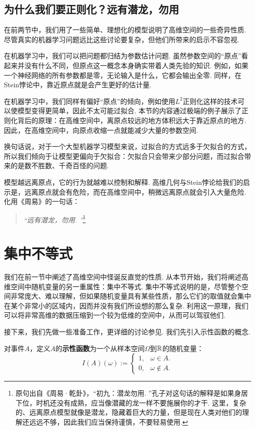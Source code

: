\subsection{为什么我们要正则化？远有潜龙，勿用}

在前两节中，我们用了一些简单、理想化的模型说明了高维空间的一些奇异性质. 尽管真实的机器学习问题远比这些讨论要复杂，但他们所带来的启示不容忽视. 

在机器学习中，我们可以把问题都归结为参数估计问题. 虽然参数空间的“原点”看起来并没有什么不同，但原点这一概念本身确实带着人类先验的知识. 例如，如果一个神经网络的所有参数都是零，无论输入是什么，它都会输出全零. 同样，在Stein悖论中，靠近原点就是会产生更好的估计量. 

在机器学习中，我们同样有偏好“原点”的倾向，例如使用$L^2$正则化这样的技术可以使模型变得更简单，因此不太可能过拟合. 本节的内容通过极端的例子展示了正则化背后的原理：在高维空间中，离原点较远的地方体积远大于靠近原点的地方. 因此，在高维空间中，向原点收缩一点就能减少大量的参数空间. 

换句话说，对于一个大型机器学习模型来说，过拟合的方式远多于欠拟合的方式，所以我们倾向于让模型更偏向于欠拟合：欠拟合只会带来少部分问题，而过拟合带来的是数不胜数、千奇百怪的问题. 

模型越远离原点，它的行为就越难以控制和解释. 高维几何与Stein悖论给我们的启示是，远离原点就会有危险，而在高维空间中，稍微远离原点就会引入大量危险. 化用《周易》的一句话：
\begin{quotation}
    \textit{“远有潜龙，勿用. ”}\footnote{原句出自《周易·乾卦》，“初九：潜龙勿用. ”孔子对这句话的解释是如果身居下位，时机还没有成熟，应当像潜藏的龙一样不要施展你的才干. 这里，复杂的、远离原点模型就像是潜龙，隐藏着巨大的力量，但是现在人类对他们的理解还远远不够，因此我们应当保持谨慎，不要轻易使用. }
\end{quotation}

\section{集中不等式}

我们在前一节中阐述了高维空间中怪诞反直觉的性质. 从本节开始，我们将阐述高维空间中随机变量的另一重属性：集中不等式. 集中不等式说明的是，尽管整个空间非常庞大、难以理解，但如果随机变量具有某些性质，那么它们的取值就会集中在某个非常小的区域内，因而并没有我们所设想的那么复杂. 利用这一原理，我们可以将非常高维的数据压缩到一个较为低维的空间中，从而可以驾驭他们. 

接下来，我们先做一些准备工作，更详细的讨论参见. 我们先引入示性函数的概念.
\begin{definition}[示性函数]\label{def:indicator-function}
    对事件$A$，定义$A$的\textbf{示性函数}为一个从样本空间$\Omega$到$\mathbb{R}$的随机变量：
\begin{equation*}
    I(A)(\omega) := 
    \begin{cases}
        1,& \omega \in A. \\
        0,& \omega \notin A.
    \end{cases}
\end{equation*}
\end{definition}

